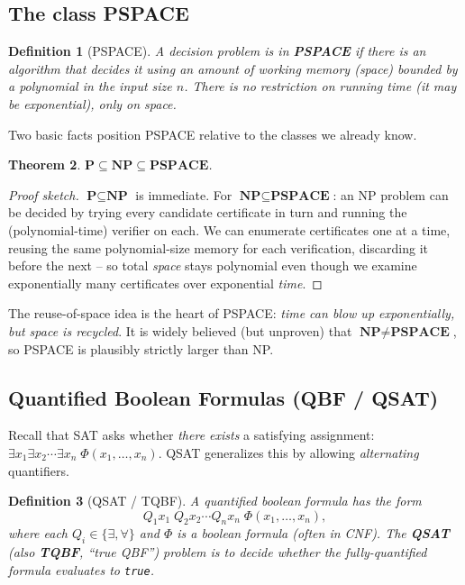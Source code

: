 \documentclass[11pt]{article}
\newtheorem{theorem}{Theorem}[section]
\newtheorem{definition}[theorem]{Definition}
\begin{document}
\subsection{The class PSPACE}

\begin{definition}[PSPACE]
A decision problem is in \textbf{PSPACE} if there is an algorithm that decides
it using an amount of \emph{working memory} (space) bounded by a polynomial in
the input size $n$. There is no restriction on running time (it may be
exponential), only on space.
\end{definition}

Two basic facts position PSPACE relative to the classes we already know.

\begin{theorem}
$\textbf{P} \subseteq \textbf{NP} \subseteq \textbf{PSPACE}$.
\end{theorem}

\begin{proof}[Proof sketch]
$\textbf{P} \subseteq \textbf{NP}$ is immediate. For $\textbf{NP} \subseteq
\textbf{PSPACE}$: an NP problem can be decided by trying every candidate
certificate in turn and running the (polynomial-time) verifier on each. We can
enumerate certificates one at a time, reusing the same polynomial-size memory
for each verification, discarding it before the next -- so total \emph{space}
stays polynomial even though we examine exponentially many certificates over
exponential \emph{time}.
\end{proof}

The reuse-of-space idea is the heart of PSPACE: \emph{time can blow up
exponentially, but space is recycled}. It is widely believed (but unproven)
that $\textbf{NP} \neq \textbf{PSPACE}$, so PSPACE is plausibly strictly larger
than NP.

\subsection{Quantified Boolean Formulas (QBF / QSAT)}

Recall that SAT asks whether \emph{there exists} a satisfying assignment:
$\exists x_1 \exists x_2 \cdots \exists x_n\; \Phi(x_1,\dots,x_n)$. QSAT
generalizes this by allowing \emph{alternating} quantifiers.

\begin{definition}[QSAT / TQBF]
A \emph{quantified boolean formula} has the form
\[
Q_1 x_1\; Q_2 x_2 \cdots Q_n x_n\; \Phi(x_1,\dots,x_n),
\]
where each $Q_i \in \{\exists, \forall\}$ and $\Phi$ is a boolean formula
(often in CNF). The \textbf{QSAT} (also \textbf{TQBF}, ``true QBF'') problem is
to decide whether the fully-quantified formula evaluates to \texttt{true}.
\end{definition}
\end{document}
